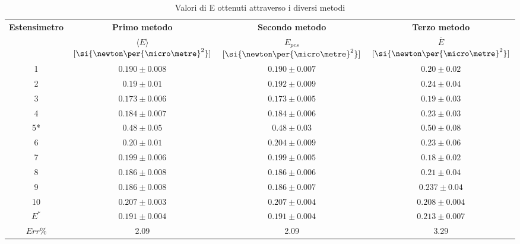 \documentclass[a4paper,11pt,oneside]{article}
\begin{document}
\begin{table}[h!]
\centering
\caption{Valori di E ottenuti attraverso i diversi metodi}
\label{tab:valori_e}
    \begin{tabular}{|c|c|c|c|}
    \hline
    \multirow{2}{*}{\textbf{Estensimetro}} & \textbf{Primo metodo}  & \textbf{Secondo metodo} & \textbf{Terzo metodo}\\
    & $\langle E \rangle$ $[\si{\newton\per{\micro\metre}^2}]$ & $E_{pes}$ $[\si{\newton\per{\micro\metre}^2}]$ & $\overline{E}$ $[\si{\newton\per{\micro\metre}^2}]$\\\hline
    {\cellcolor[rgb]{0.85,0.85,0.85}}1 & {\cellcolor[rgb]{0.85,0.85,0.85}}$0.190 \pm 0.008$ & {\cellcolor[rgb]{0.85,0.85,0.85}}$0.190 \pm 0.007$ & {\cellcolor[rgb]{0.85,0.85,0.85}}$0.20 \pm 0.02$ \\ \hline
    2 & $0.19 \pm 0.01$ & $0.192 \pm 0.009$ & $0.24 \pm 0.04$ \\ \hline
    {\cellcolor[rgb]{0.85,0.85,0.85}}3 & {\cellcolor[rgb]{0.85,0.85,0.85}}$0.173 \pm 0.006$ & {\cellcolor[rgb]{0.85,0.85,0.85}}$0.173 \pm 0.005$ & {\cellcolor[rgb]{0.85,0.85,0.85}}$0.19 \pm 0.03$ \\ \hline
    4 & $0.184 \pm 0.007$ & $0.184 \pm 0.006$ & $0.23 \pm 0.03$ \\ \hline
    {\cellcolor[rgb]{0.85,0.85,0.85}}5*& {\cellcolor[rgb]{0.85,0.85,0.85}}$0.48 \pm 0.05$ & {\cellcolor[rgb]{0.85,0.85,0.85}}$0.48 \pm 0.03$ & {\cellcolor[rgb]{0.85,0.85,0.85}}$0.50 \pm 0.08$ \\ \hline
    6 & $0.20\pm 0.01$ & $0.204 \pm 0.009$ & $0.23 \pm 0.06$ \\ \hline
    {\cellcolor[rgb]{0.85,0.85,0.85}}7 & {\cellcolor[rgb]{0.85,0.85,0.85}}$0.199 \pm 0.006$ & {\cellcolor[rgb]{0.85,0.85,0.85}}$0.199 \pm 0.005$ & {\cellcolor[rgb]{0.85,0.85,0.85}}$0.18 \pm 0.02$ \\ \hline
    8 & $0.186 \pm 0.008$ & $0.186 \pm 0.006$ & $0.21 \pm 0.04$ \\ \hline
    {\cellcolor[rgb]{0.85,0.85,0.85}}9 & {\cellcolor[rgb]{0.85,0.85,0.85}}$0.186 \pm 0.008$ & {\cellcolor[rgb]{0.85,0.85,0.85}}$0.186 \pm 0.007$ & {\cellcolor[rgb]{0.85,0.85,0.85}}$0.237 \pm 0.04$ \\ \hline
    10& $0.207 \pm 0.003$ & $0.207 \pm 0.004 $ & $0.208 \pm 0.004$ \\ \hline \hline
    {\cellcolor[rgb]{0.85,0.85,0.85}}$E^{\ast}$ & {\cellcolor[rgb]{0.85,0.85,0.85}}$0.191\pm0.004$ & {\cellcolor[rgb]{0.85,0.85,0.85}}$0.191\pm0.004$ & {\cellcolor[rgb]{0.85,0.85,0.85}}$0.213\pm0.007$   \\ \hline
    $Err\% $ & 2.09 & 2.09 & 3.29 \\ \hline
\end{tabular}
\end{table}
\end{document}
